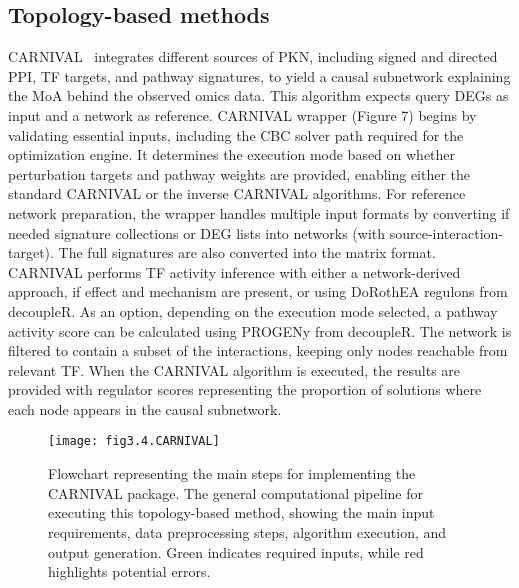 \subsection{Topology-based methods} %
\label{sub:topologybasedmethods}

\gls{CARNIVAL}~\cite{RN41} integrates different sources of \gls{PKN}, including signed and directed \gls{PPI}, \gls{TF} targets, and pathway signatures, to yield a causal subnetwork explaining the MoA behind the observed omics data. This algorithm expects query \gls{DEGs} as input and a network as reference. \gls{CARNIVAL} wrapper (Figure 7) begins by validating essential inputs, including the CBC solver path required for the optimization engine. 
It determines the execution mode based on whether perturbation targets and pathway weights are provided, enabling either the standard CARNIVAL or the inverse \gls{CARNIVAL} algorithms. 
For reference network preparation, the wrapper handles multiple input formats by converting if needed signature collections or DEG lists into networks (with source-interaction-target). The full signatures are also converted into the matrix format. \gls{CARNIVAL} performs \gls{TF} activity inference with either a network-derived approach, if effect and mechanism are present, or using DoRothEA regulons from decoupleR. 
As an option, depending on the execution mode selected, a pathway activity score can be calculated using PROGENy from decoupleR. 
The network is filtered to contain a subset of the interactions, keeping only nodes reachable from relevant \gls{TF}. When the \gls{CARNIVAL} algorithm is executed, the results are provided with regulator scores representing the proportion of solutions where each node appears in the causal subnetwork.


\begin{figure}[htbp]
    \centering
    \texttt{[image: fig3.4.CARNIVAL]}
    \caption[Flowchart representing the main steps for implementing the CARNIVAL package.]{Flowchart representing the main steps for implementing the CARNIVAL package. The general computational pipeline for executing this topology-based method, showing the main input requirements, data preprocessing steps, algorithm execution, and output generation. Green indicates required inputs, while red highlights potential errors.}
    \label{fig:fig3.4.CARNIVAL}
\end{figure}

